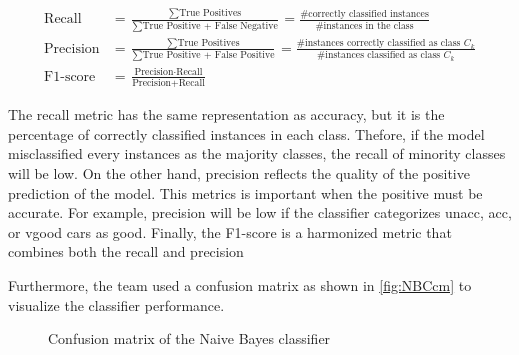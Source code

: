 \documentclass[a4paper]{article}
\begin{document}
\begin{subequations}
\begin{align}
  \text{Recall} &= \frac{\sum \text{True Positives}}{\sum \text{True Positive + False Negative}} = \frac{\text{\# correctly classified instances}}{\text{\# instances in the class}} \\
  \text{Precision} &= \frac{\sum \text{True Positives}}{\sum \text{True Positive + False Positive}} = \frac{\text{\# instances correctly classified as class } C_k}{\text{\# instances classified as class } C_k} \\
  \text{F1-score} &= \frac{\text{Precision}\cdot\text{Recall}}{\text{Precision}+\text{Recall}}
\end{align}
\end{subequations}

The recall metric has the same representation as accuracy, but it is the percentage of correctly classified instances in each class. Thefore, if the model misclassified every instances as the majority classes, the recall of minority classes will be low. On the other hand, precision reflects the quality of the positive prediction of the model. This metrics is important when the positive must be accurate. For example, precision will be low if the classifier categorizes unacc, acc, or vgood cars as good. Finally, the F1-score is a harmonized metric that combines both the recall and precision

Furthermore, the team used a confusion matrix as shown in \autoref{fig:NBCcm} to visualize the classifier performance.

\begin{figure} [h]
  \caption{Confusion matrix of the Naive Bayes classifier} 
  \label{fig:NBCcm}
\end{figure}
\end{document}
